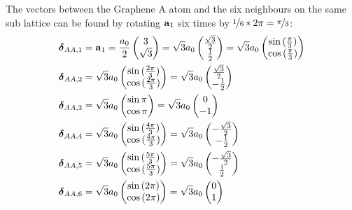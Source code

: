 The vectors between the Graphene \(\mathrm{A}\) atom and the six neighbours on the same sub lattice can be found by rotating \(\bm{\mathrm{a}}_1\) six times by \(\nicefrac{1}{6} * 2\pi = \nicefrac{\pi}{3}\):
\begin{align}
    \bm{\mathrm{\delta}}_{AA, 1} &= \bm{\mathrm{a}}_1 = \frac{a_0}{2} \begin{pmatrix} 3 \\ \sqrt{3} \end{pmatrix} = \sqrt{3} a_0 \begin{pmatrix} \frac{\sqrt{3}}{2} \\ \frac{1}{2} \end{pmatrix} = \sqrt{3} a_0 \begin{pmatrix} \sin{(\frac{\pi}{3})} \\ \cos{(\frac{\pi}{3})} \end{pmatrix} \\
    \bm{\mathrm{\delta}}_{AA, 2} &= \sqrt{3} a_0 \begin{pmatrix} \sin{(\frac{2\pi}{3})} \\ \cos{(\frac{2\pi}{3})} \end{pmatrix} = \sqrt{3} a_0 \begin{pmatrix} \frac{\sqrt{3}}{2} \\ -\frac{1}{2} \end{pmatrix} \\
    \bm{\mathrm{\delta}}_{AA, 3} &= \sqrt{3} a_0 \begin{pmatrix} \sin{\pi} \\ \cos{\pi} \end{pmatrix} = \sqrt{3} a_0 \begin{pmatrix} 0 \\ -1 \end{pmatrix} \\
    \bm{\mathrm{\delta}}_{AA, 4} &= \sqrt{3} a_0 \begin{pmatrix} \sin{(\frac{4\pi}{3})} \\ \cos{(\frac{4\pi}{3})} \end{pmatrix} = \sqrt{3} a_0 \begin{pmatrix} -\frac{\sqrt{3}}{2} \\ -\frac{1}{2} \end{pmatrix} \\
    \bm{\mathrm{\delta}}_{AA, 5} &= \sqrt{3} a_0 \begin{pmatrix} \sin{(\frac{5\pi}{3})} \\ \cos{(\frac{5\pi}{3})} \end{pmatrix} = \sqrt{3} a_0 \begin{pmatrix} -\frac{\sqrt{3}}{2} \\ \frac{1}{2} \end{pmatrix} \\
    \bm{\mathrm{\delta}}_{AA, 6} &= \sqrt{3} a_0 \begin{pmatrix} \sin{(2\pi)} \\ \cos{(2\pi)} \end{pmatrix} = \sqrt{3} a_0 \begin{pmatrix} 0 \\ 1 \end{pmatrix} \\
\end{align}

